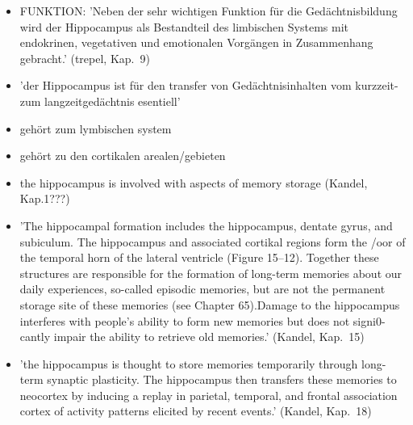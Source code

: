 \documentclass[12pt,a4paper,pdftex]{article}
\begin{document}
\begin{itemize}
\item FUNKTION: 'Neben der sehr wichtigen Funktion für die Gedächtnisbildung wird der Hippocampus als Bestandteil des limbischen Systems mit endokrinen, vegetativen und emotionalen Vorgängen in Zusammenhang gebracht.' (trepel, Kap.~9)

\item 'der Hippocampus ist für den transfer von Gedächtnisinhalten vom kurzzeit- zum langzeitgedächtnis esentiell' \cite[Kap.~6]{storch2012lehrbuchzoo}

\item gehört zum lymbischen system \cite[Kap.~6]{storch2012lehrbuchzoo}

\item gehört zu den cortikalen arealen/gebieten  \cite[Kap.~6]{storch2012lehrbuchzoo}

\item the hippocampus is involved with aspects of memory storage (Kandel, Kap.1???)

\item 'The hippocampal formation includes the hippocampus, dentate gyrus, and subiculum. The hippocampus and associated cortikal regions form the /oor of the temporal horn of the lateral ventricle (Figure 15–12). Together these structures are responsible for the formation of long-term memories about our daily experiences, so-called episodic memories, but are not the permanent storage site of these memories (see Chapter 65).Damage to the hippocampus interferes with people’s ability to form new memories but does not signi0-cantly impair the ability to retrieve old memories.' (Kandel, Kap.~15)

\item 'the hippocampus is thought to store memories temporarily through long-term synaptic plasticity. The hippocampus then transfers these memories to neocortex by inducing a replay in parietal, temporal, and frontal association cortex of activity patterns elicited by recent events.' (Kandel, Kap.~18)

\end{itemize}
\end{document}
